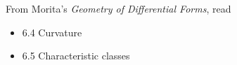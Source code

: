 \documentclass{homework}
\author{Jim Fowler}
\date{Week 16: Curvature}
\begin{document}
\maketitle

From Morita's \textit{Geometry of Differential Forms}, read
\begin{itemize}
\item 6.4 Curvature
\item 6.5 Characteristic classes
\end{itemize}
\end{document}
